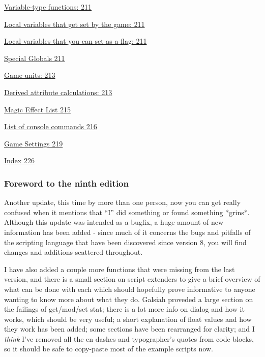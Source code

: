 \documentclass[
]{article}
\begin{document}
\protect\hyperlink{variable-type-functions}{Variable-type functions:
211}

\protect\hyperlink{local-variables-that-get-set-by-the-game}{Local
variables that get set by the game: 211}

\protect\hyperlink{local-variables-that-you-can-set-as-a-flag}{Local
variables that you can set as a flag: 211}

\protect\hyperlink{special-globals}{Special Globals 211}

\protect\hyperlink{game-units}{Game units: 213}

\protect\hyperlink{derived-attribute-calculations}{Derived attribute
calculations: 213}

\protect\hyperlink{_Toc53412751}{Magic Effect List 215}

\protect\hyperlink{list-of-console-commands}{List of console commands
216}

\protect\hyperlink{game-settings}{Game Settings 219}

\protect\hyperlink{index}{Index 226}

\hypertarget{foreword-to-the-ninth-edition}{%
\subsubsection{\texorpdfstring{\hfill\break
Foreword to the ninth
edition}{ Foreword to the ninth edition}}\label{foreword-to-the-ninth-edition}}

Another update, this time by more than one person, now you can get
really confused when it mentions that ``I'' did something or found
something *grins*. Although this update was intended as a bugfix, a huge
amount of new information has been added - since much of it concerns the
bugs and pitfalls of the scripting language that have been discovered
since version 8, you will find changes and additions scattered
throughout.

I have also added a couple more functions that were missing from the
last version, and there is a small section on script extenders to give a
brief overview of what can be done with each which should hopefully
prove informative to anyone wanting to know more about what they do.
Galsiah proveded a large section on the failings of get/mod/set stat;
there is a lot more info on dialog and how it works, which should be
very useful; a short explanation of float values and how they work has
been added; some sections have been rearranged for clarity; and I
\emph{think} I've removed all the en dashes and typographer's quotes
from code blocks, so it should be safe to copy-paste most of the example
scripts now.
\end{document}

